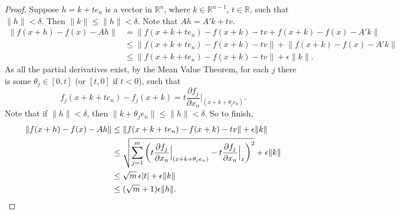 \documentclass[12pt,openany]{book}
\newcommand{\sabs}[1]{\lvert {#1} \rvert}
\newcommand{\snorm}[1]{\lVert {#1} \rVert}
\newcommand{\R}{{\mathbb{R}}}
\theoremstyle{plain}
\theoremstyle{remark}
\theoremstyle{definition}
\theoremstyle{exercise}
\theoremstyle{example}
\begin{document}
\begin{proof}
Suppose $h = k + t e_n$ is a vector in $\R^n$, where $k \in \R^{n-1}$, $t
\in \R$, such that
$\snorm{h} < \delta$.  Then $\snorm{k} \leq \snorm{h} < \delta$.
Note that $Ah = A' k + tv$.
\begin{equation*}
\begin{split}
\snorm{f(x+h) - f(x) - Ah}
& = \snorm{f(x+k + t e_n) - f(x+k) - tv + f(x+k) - f(x) - A' k}
\\
& \leq \snorm{f(x+k + t e_n) - f(x+k) -tv} + \snorm{f(x+k) - f(x) -
A' k}
\\
& \leq \snorm{f(x+k + t e_n) - f(x+k) -tv} + \epsilon \snorm{k} .
\end{split}
\end{equation*}
As all the partial derivatives exist, by the Mean Value Theorem,
for each $j$ there is some $\theta_j \in [0,t]$ (or $[t,0]$ if $t < 0$), such that
\begin{equation*}
f_j(x+k + t e_n) - f_j(x+k) =
t \frac{\partial f_j}{\partial x_n}\Big|_{(x+k+\theta_j e_n)}.
\end{equation*}
Note that if $\snorm{h} < \delta$, then $\snorm{k+\theta_j e_n} \leq \snorm{h}
< \delta$.
So to finish,
\begin{equation*}
\begin{split}
\snorm{f(x+h) - f(x) - Ah}
& \leq \snorm{f(x+k + t e_n) - f(x+k) -tv} + \epsilon \snorm{k}
\\
& \leq \sqrt{\sum_{j=1}^m
{\left(t\frac{\partial f_j}{\partial x_n}\Big|_{(x+k+\theta_j e_n)} -
t \frac{\partial f_j}{\partial x_n}\Big|_{x}\right)}^2} + \epsilon \snorm{k}
\\
& \leq \sqrt{m}\, \epsilon \sabs{t} + \epsilon \snorm{k}
\\
& \leq (\sqrt{m}+1)\epsilon \snorm{h} . \qedhere
\end{split}
\end{equation*}
\end{proof}
\end{document}
